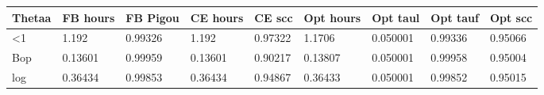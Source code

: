 \begin{tabular}{lllllllll}
Thetaa & FB hours & FB Pigou & CE hours & CE scc & Opt hours & Opt taul & Opt tauf & Opt scc \\ 
\hline 
<1 & 1.192 & 0.99326 & 1.192 & 0.97322 & 1.1706 & 0.050001 & 0.99336 & 0.95066 \\ 
Bop & 0.13601 & 0.99959 & 0.13601 & 0.90217 & 0.13807 & 0.050001 & 0.99958 & 0.95004 \\ 
log & 0.36434 & 0.99853 & 0.36434 & 0.94867 & 0.36433 & 0.050001 & 0.99852 & 0.95015 \\ 
\hline 
\end{tabular}
